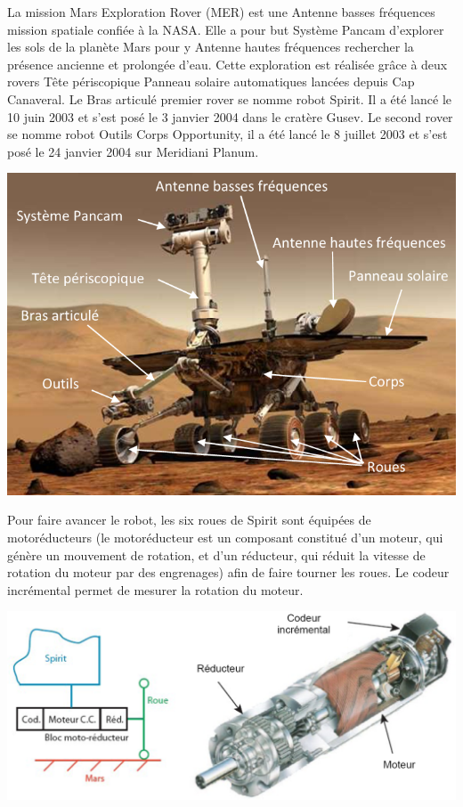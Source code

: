 \documentclass[10pt]{article}
\begin{document}
\begin{minipage}[c]{.57\linewidth}

La mission Mars Exploration Rover (MER) est une Antenne basses fréquences mission spatiale confiée à la NASA. Elle a pour but Système Pancam d’explorer les sols de la planète Mars pour y Antenne hautes fréquences rechercher la présence ancienne et prolongée d’eau.  Cette exploration est réalisée grâce à deux rovers Tête périscopique Panneau solaire automatiques lancées depuis Cap Canaveral. Le Bras articulé premier rover se nomme robot Spirit. Il a été lancé le 10 juin 2003 et s’est posé le 3 janvier 2004 dans le cratère Gusev. Le second rover se nomme robot Outils Corps Opportunity, il a été lancé le 8 juillet 2003 et s’est posé le 24 janvier 2004 sur Meridiani Planum. 
 
\end{minipage} \hfill
\begin{minipage}[c]{.4\linewidth}
\begin{center}
\includegraphics[width=.9\textwidth]{images/fig_01}
\end{center}
\end{minipage}

\vspace{.5cm}

Pour faire avancer le robot, les six roues de Spirit sont équipées de motoréducteurs (le motoréducteur est un composant constitué d'un moteur, qui génère un mouvement de rotation, et d'un réducteur, qui réduit la vitesse de rotation du moteur par des engrenages) afin de faire tourner les roues. Le codeur incrémental permet de mesurer la rotation du moteur. 

\begin{center}
\includegraphics[width=.8\textwidth]{images/fig_02}
\end{center}
\end{document}
